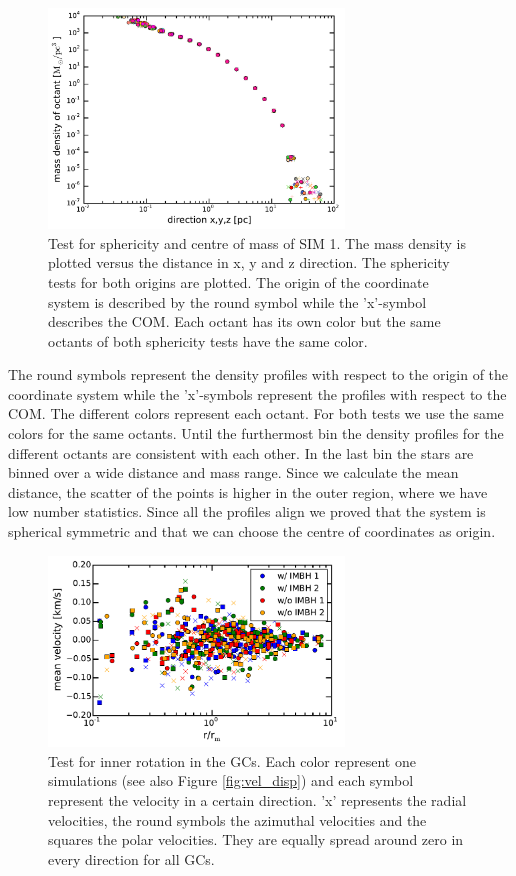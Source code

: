 \begin{figure}[htbp]
\centering
\includegraphics[width=0.7\textwidth]{Plots/sphericity_com.pdf}
\caption{Test for sphericity and centre of mass of SIM 1. The mass density is plotted versus the distance in x, y and z direction. The sphericity tests for both origins are plotted. The origin of the coordinate system is described by the round symbol while the 'x'-symbol describes the \ac{COM}. Each octant has its own color but the same octants of both sphericity tests have the same color.}
\label{fig:sphericity_com}
\end{figure}
The round symbols represent the density profiles with respect to the origin of the coordinate system while the 'x'-symbols represent the profiles with respect to the \ac{COM}. The different colors represent each octant. For both tests we use the same colors for the same octants. Until the furthermost bin the density profiles for the different octants are consistent with each other. In the last bin the stars are binned over a wide distance and mass range. Since we calculate the mean distance, the scatter of the points is higher in the outer region, where we have low number statistics. Since all the profiles align we proved that the system is spherical symmetric and that we can choose the centre of coordinates as origin. 
\par 
\begin{figure}[htbp]
\centering
\includegraphics[width=0.7\textwidth]{Plots/mean_velocity.pdf}
\caption{Test for inner rotation in the \acp{GC}. Each color represent one simulations (see also Figure \ref{fig:vel_disp}) and each symbol represent the velocity in a certain direction. 'x' represents the radial velocities, the round symbols the azimuthal velocities and the squares the polar velocities. They are equally spread around zero in every direction for all \acp{GC}.}
\label{fig:mean_vel}
\end{figure}
